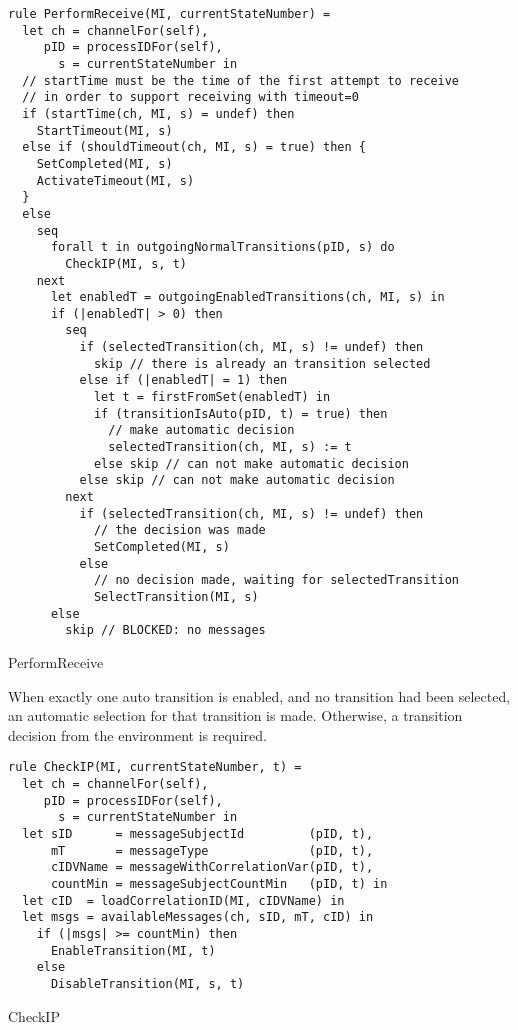 \begin{listing}[htbp]
\begin{verbatim}
rule PerformReceive(MI, currentStateNumber) =
  let ch = channelFor(self),
     pID = processIDFor(self),
       s = currentStateNumber in
  // startTime must be the time of the first attempt to receive
  // in order to support receiving with timeout=0
  if (startTime(ch, MI, s) = undef) then
    StartTimeout(MI, s)
  else if (shouldTimeout(ch, MI, s) = true) then {
    SetCompleted(MI, s)
    ActivateTimeout(MI, s)
  }
  else
    seq
      forall t in outgoingNormalTransitions(pID, s) do
        CheckIP(MI, s, t)
    next
      let enabledT = outgoingEnabledTransitions(ch, MI, s) in
      if (|enabledT| > 0) then
        seq
          if (selectedTransition(ch, MI, s) != undef) then
            skip // there is already an transition selected
          else if (|enabledT| = 1) then
            let t = firstFromSet(enabledT) in
            if (transitionIsAuto(pID, t) = true) then
              // make automatic decision
              selectedTransition(ch, MI, s) := t
            else skip // can not make automatic decision
          else skip // can not make automatic decision
        next
          if (selectedTransition(ch, MI, s) != undef) then
            // the decision was made
            SetCompleted(MI, s)
          else
            // no decision made, waiting for selectedTransition
            SelectTransition(MI, s)
      else
        skip // BLOCKED: no messages
\end{verbatim}
\caption{PerformReceive}
\label{lst:shortasm:PerformReceive}
\end{listing}




When exactly one auto transition is enabled, and no transition had been selected, an
automatic selection for that transition is made. Otherwise, a transition decision from
the environment is required.




\begin{listing}[htbp]
\begin{verbatim}
rule CheckIP(MI, currentStateNumber, t) =
  let ch = channelFor(self),
     pID = processIDFor(self),
       s = currentStateNumber in
  let sID      = messageSubjectId         (pID, t),
      mT       = messageType              (pID, t),
      cIDVName = messageWithCorrelationVar(pID, t),
      countMin = messageSubjectCountMin   (pID, t) in
  let cID  = loadCorrelationID(MI, cIDVName) in
  let msgs = availableMessages(ch, sID, mT, cID) in
    if (|msgs| >= countMin) then
      EnableTransition(MI, t)
    else
      DisableTransition(MI, s, t)
\end{verbatim}
\caption{CheckIP}
\label{lst:shortasm:CheckIP}
\end{listing}


